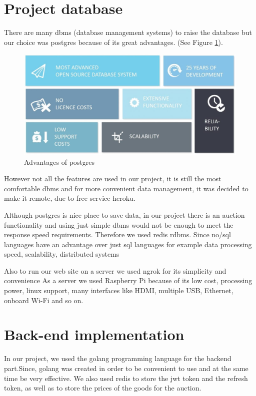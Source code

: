 \section{Project database}
There are many dbms (database management systems) to raise the database but our choice was
postgres\cite{greenpeace} because of its great advantages. (See Figure \ref{fig:database}).
\begin{figure}[ht!]
    \centering
    \includegraphics[scale=0.5]{figures/database.jpg}
    \caption{Advantages of postgres}
    \label{fig:database}
\end{figure}

However not all the features are used in our project, it is still the most comfortable dbms
and for more convenient data management, it was decided to make it remote, due to free
service heroku.

Although postgres is nice place to save data\cite{postgre}, in our project there is an auction
functionality and using just simple dbms would not be enough to meet the response speed
requirements. Therefore we used redis rdbms. Since no/sql languages   have an advantage over
just sql languages   for example data processing speed, scalability, distributed systems

Also to run our web site on a server we used ngrok for its simplicity and convenience
As a server we used Raspberry Pi because of its low cost, processing power, linux support, many
interfaces like HDMI, multiple USB, Ethernet, onboard Wi-Fi and so on.
\clearpage
\section{Back-end implementation}
In our project, we used the golang programming language for the backend part.Since, golang was created in order to be convenient to use and at the same time be very effective\cite{golang}. We also used redis to store the jwt token and the refresh token, as well as to store the prices of the goods for the auction. 

